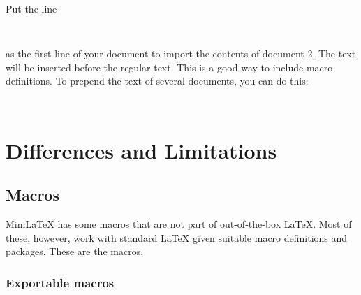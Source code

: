 Put the line

\begin{verbatim}
  
\end{verbatim}

as the first line of your document to import the contents of document 2.  The text will be inserted before the regular text.  This is a good way to include macro definitions.  To prepend the text of several documents, you can do this:

\begin{verbatim}
  
\end{verbatim}

\section{Differences and Limitations}

\subsection{Macros}

MiniLaTeX has some macros that are not part of out-of-the-box LaTeX. Most of these, however, work with standard LaTeX given suitable macro definitions and packages. These are the  macros.

\subsubsection{Exportable macros}

